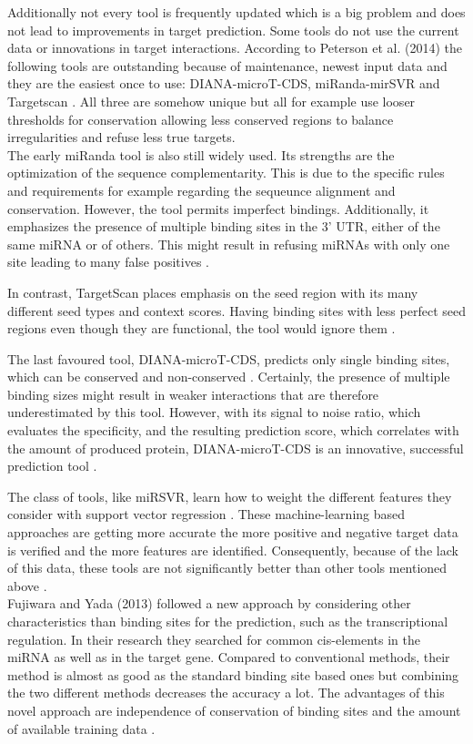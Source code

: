 \documentclass[11pt,  a4paper]{report}
\begin{document}
Additionally not every tool is frequently updated which is a big problem and does not lead to improvements in target prediction. Some tools do not use the current data or innovations in target interactions. According to Peterson et al. (2014) the following tools are outstanding because of maintenance, newest input data and they are the easiest once to use: DIANA-microT-CDS, miRanda-mirSVR and Targetscan \cite{Peterson}. All three are somehow unique but all for example use looser thresholds for conservation allowing less conserved regions to balance irregularities and refuse less true targets.\\

The early miRanda tool is also still widely used. Its strengths are the optimization of the sequence complementarity. This is due to the specific rules and requirements for example regarding the sequeunce alignment and conservation. However, the tool permits imperfect bindings. Additionally, it emphasizes the presence of multiple binding sites in the 3' UTR, either of the same miRNA or of others. This might result in refusing miRNAs with only one site leading to many false positives \cite{John}. 

In contrast, TargetScan places emphasis on the seed region with its many different seed types and context scores. Having binding sites with less perfect seed regions even though they are functional, the tool would ignore them \cite{Lewis}.

The last favoured tool, DIANA-microT-CDS, predicts only single binding sites, which can be conserved and non-conserved \cite{Kiriakidou}. Certainly, the presence of multiple binding sizes might result in weaker interactions that are therefore underestimated by this tool. However, with its signal to noise ratio, which evaluates the specificity, and the resulting prediction score, which correlates with the amount of produced protein, DIANA-microT-CDS is an innovative, successful prediction tool \cite{Maragkakis}.

The class of tools, like miRSVR, learn how to weight the different features they consider with support vector regression \cite{Betel}. These machine-learning based approaches are getting more accurate the more positive and negative target data is verified and the more features are identified. Consequently, because of the lack of this data, these tools are not significantly better than other tools mentioned above \cite{Peterson}. \\

Fujiwara and Yada (2013) followed a new approach by considering other characteristics than binding sites for the prediction, such as the transcriptional regulation. In their research they searched for common cis-elements in the miRNA as well as in the target gene. Compared to conventional methods, their method is almost as good as the standard binding site based ones but combining the two different methods decreases the accuracy a lot. The advantages of this novel approach are independence of conservation of binding sites and the amount of available training data \cite{Fuji}. \\
\end{document}
